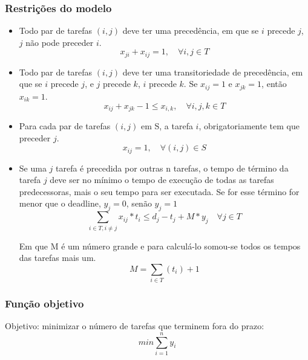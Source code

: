 \documentclass[11pt,letterpaper]{article}
\begin{document}
\subsubsection*{Restrições do modelo}
\begin{itemize}

\item Todo par de tarefas $(i,j)$ deve ter uma precedência, em que se $i$
  precede $j$, $j$ não pode preceder $i$. 
\begin{equation*}
  x_{ji}+x_{ij}=1, \quad\forall i,j \in T
\end{equation*}

\item Todo par de tarefas $(i,j)$ deve ter uma transitoriedade de precedência, em que se $i$
  precede $j$, e $j$ precede $k$, $i$ precede $k$. Se $x_{ij}=1$ e
  $x_{jk}=1$, então $x_{ik}=1$.
\begin{equation*}
  x_{ij}+x_{jk}-1 \leq x_{i,k}, \quad \forall i,j,k \in T
\end{equation*}


\item Para cada par de tarefas $(i,j)$ em S, a tarefa $i$,
  obrigatoriamente tem que preceder $j$. 
\begin{equation*}
  x_{ij} = 1,\quad \forall (i,j) \in S
\end{equation*}

\item Se uma $j$ tarefa é precedida por outras n tarefas, o tempo de
  término da tarefa $j$ deve ser no mínimo o tempo de execução de todas
  as tarefas predecessoras, mais o seu tempo para ser executada. Se
  for esse término for menor que o deadline, $y_{j}=0$, senão $y_{j}=1$ 
\begin{equation*}
 \sum_{i \in T, i \neq j} x_{ij}*t_{i} \leq d_{j}-t_{j}+ M*y_{j}\quad \forall j \in T
\end{equation*}
 
Em que M é um número grande e para calculá-lo somou-se todos os tempos
das tarefas mais um. 
\begin{equation*}
 M = \sum_{i \in T} (t_{i}) +1
\end{equation*}
 
\end{itemize}

\subsubsection*{Função objetivo}
Objetivo: minimizar o número de tarefas que terminem fora do prazo:
\begin{equation}
min\sum_{i=1}^{n}y_i
\end{equation}
\end{document}

